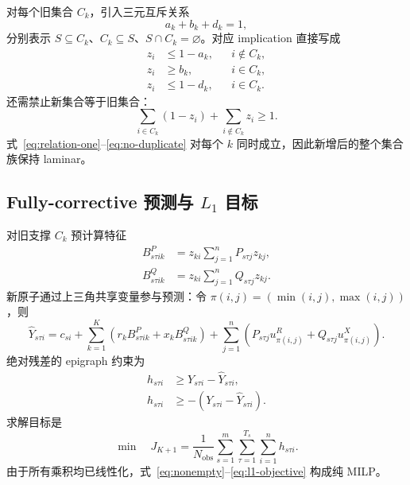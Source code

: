 \documentclass[UTF8,11pt]{ctexart}
\begin{document}
对每个旧集合 $C_k$，引入三元互斥关系
\begin{equation}
 a_k+b_k+d_k=1,
 \label{eq:relation-one}
\end{equation}
分别表示 $S\subseteq C_k$、$C_k\subseteq S$、$S\cap C_k=\varnothing$。对应 implication 直接写成
\begin{align}
 z_i&\le1-a_k, && i\notin C_k,\label{eq:subset}\\
 z_i&\ge b_k, && i\in C_k,\label{eq:superset}\\
 z_i&\le1-d_k, && i\in C_k.\label{eq:disjoint}
\end{align}
还需禁止新集合等于旧集合：
\begin{equation}
 \sum_{i\in C_k}(1-z_i)+\sum_{i\notin C_k}z_i\ge1.
 \label{eq:no-duplicate}
\end{equation}
式~\eqref{eq:relation-one}--\eqref{eq:no-duplicate} 对每个 $k$ 同时成立，因此新增后的整个集合族保持 laminar。

\subsection{Fully-corrective 预测与 \texorpdfstring{$L_1$}{L1} 目标}

对旧支撑 $C_k$ 预计算特征
\begin{align}
 B^P_{s\tau ik}
 &=z_{ki}\sum_{j=1}^{n}P_{s\tau j}z_{kj},\\
 B^Q_{s\tau ik}
 &=z_{ki}\sum_{j=1}^{n}Q_{s\tau j}z_{kj}.
\end{align}
新原子通过上三角共享变量参与预测：令
$\pi(i,j)=(\min(i,j),\max(i,j))$，则
\begin{equation}
 \widehat Y_{s\tau i}=c_{si}
 +\sum_{k=1}^{K}\left(r_k B^P_{s\tau ik}+x_kB^Q_{s\tau ik}\right)
 +\sum_{j=1}^{n}\left(P_{s\tau j}u^R_{\pi(i,j)}+Q_{s\tau j}u^X_{\pi(i,j)}\right).
 \label{eq:prediction}
\end{equation}
绝对残差的 epigraph 约束为
\begin{align}
 h_{s\tau i}&\ge Y_{s\tau i}-\widehat Y_{s\tau i},\label{eq:l1a}\\
 h_{s\tau i}&\ge-\left(Y_{s\tau i}-\widehat Y_{s\tau i}\right).
 \label{eq:l1b}
\end{align}
求解目标是
\begin{equation}
 \min\quad J_{K+1}=\frac{1}{N_{\mathrm{obs}}}
 \sum_{s=1}^{m}\sum_{\tau=1}^{T_s}\sum_{i=1}^{n}h_{s\tau i}.
 \label{eq:l1-objective}
\end{equation}
由于所有乘积均已线性化，式~\eqref{eq:nonempty}--\eqref{eq:l1-objective} 构成纯 MILP。
\end{document}
